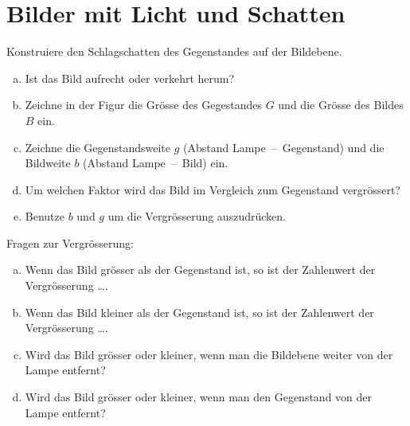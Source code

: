 \documentclass[12pt,a4paper,twoside]{article}
\begin{document}
\section{Bilder mit Licht und Schatten}
\begin{aufgabe}
	Konstruiere den Schlagschatten des Gegenstandes auf der Bildebene.


\begin{enumerate}[a)]
	\item Ist das Bild aufrecht oder verkehrt herum?
	\item Zeichne in der Figur die Grösse des Gegestandes $G$ und die Grösse des Bildes $B$ ein.
	\item Zeichne die Gegenstandsweite $g$ (Abstand Lampe\ --\ Gegenstand) und die Bildweite $b$
		(Abstand Lampe\ --\ Bild) ein.
	\item Um welchen Faktor wird das Bild im Vergleich zum Gegenstand vergrössert?
	\item Benutze $b$ und $g$ um die Vergrösserung auszudrücken.
\end{enumerate}
\end{aufgabe}


\newpage


\begin{aufgabe}
	Fragen zur Vergrösserung:
	\begin{enumerate}[a)]
		\item Wenn das Bild grösser als der Gegenstand ist, so ist der Zahlenwert der Vergrösserung \ldots.
		\item Wenn das Bild kleiner als der Gegenstand ist, so ist der Zahlenwert der Vergrösserung \ldots.
		\item Wird das Bild grösser oder kleiner, wenn man die Bildebene weiter von der Lampe entfernt?
		\item Wird das Bild grösser oder kleiner, wenn man den Gegenstand von der Lampe entfernt?
	\end{enumerate}
\end{aufgabe}
\end{document}
